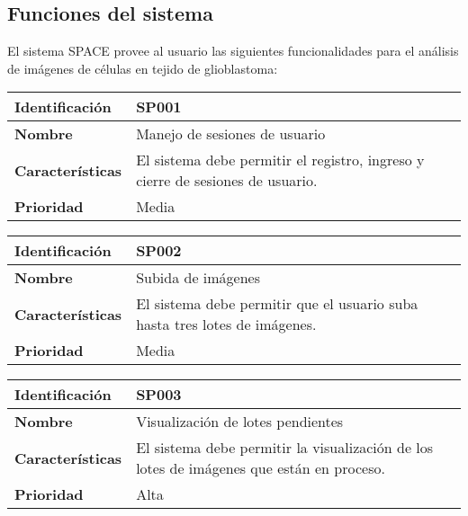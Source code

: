\documentclass{scrreprt}
\begin{document}
\subsection{Funciones del sistema}

El sistema SPACE provee al usuario las siguientes funcionalidades para el análisis  de imágenes de células en tejido de glioblastoma:\\


\begin{tabular}{ |p{3cm}|p{10cm}|  }
  \hline
  \textbf{Identificación} & SP001  \\
  \hline
  \textbf{Nombre} & Manejo de sesiones de usuario \\
  \hline
  \textbf{Características} & El sistema debe permitir el registro, ingreso y cierre de sesiones de usuario. \\
  \hline
  \textbf{Prioridad} & Media \\
  \hline
\end{tabular}

\vspace{0.8cm}

\begin{tabular}{ |p{3cm}|p{10cm}|  }
  \hline
  \textbf{Identificación} & SP002  \\
  \hline
  \textbf{Nombre} & Subida de imágenes \\
  \hline
  \textbf{Características} & El sistema debe permitir que el usuario suba hasta tres lotes de imágenes. \\
  \hline
  \textbf{Prioridad} & Media \\
  \hline
\end{tabular}

\vspace{0.8cm}

\begin{tabular}{ |p{3cm}|p{10cm}|  }
  \hline
  \textbf{Identificación} & SP003  \\
  \hline
  \textbf{Nombre} & Visualización de lotes pendientes  \\
  \hline
  \textbf{Características} & El sistema debe permitir la visualización de los lotes de imágenes que están en proceso.  \\
  \hline
  \textbf{Prioridad} & Alta \\
  \hline
\end{tabular}
\end{document}
